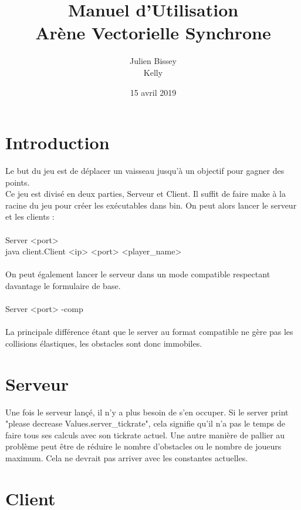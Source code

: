 \documentclass{article}
\begin{document}
\title{Manuel d'Utilisation\\
Arène Vectorielle Synchrone{}}
\author{Julien Bissey\\Kelly}
\date{15 avril 2019}

\maketitle

\section{Introduction}
Le but du jeu est de déplacer un vaisseau jusqu'à un objectif pour gagner des points.\\
Ce jeu est divisé en deux parties, Serveur et Client.
Il suffit de faire make à la racine du jeu pour créer les exécutables dans bin.
On peut alors lancer le serveur et les clients :\\
\\
Server <port>\\
java client.Client <ip> <port> <player\_name>\\
\\
On peut également lancer le serveur dans un mode compatible respectant davantage le formulaire de base.\\
\\
Server <port> -comp\\
\\
La principale différence étant que le server au format compatible ne gère pas les collisions élastiques, les obstacles sont donc immobiles.

\section{Serveur}

Une fois le serveur lançé, il n'y a plus besoin de s'en occuper.
Si le server print "please decrease Values.server\_tickrate", cela signifie qu'il n'a pas le temps
de faire tous ses calculs avec son tickrate actuel. Une autre manière de pallier au problème peut être de réduire le nombre d'obstacles ou le nombre de joueurs maximum.
Cela ne devrait pas arriver avec les constantes actuelles.\\

\section{Client}
\end{document}
